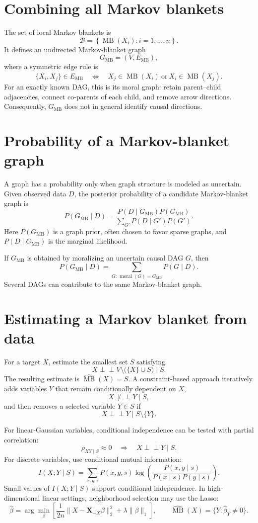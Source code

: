 \documentclass[11pt]{article}
\newcommand{\MB}{\operatorname{MB}}
\newcommand{\indep}{\perp\!\!\!\perp}
\begin{document}
\section{Combining all Markov blankets}

The set of local Markov blankets is
\[
  \mathcal{B}=\left\{\MB(X_i): i=1,\ldots,n\right\}.
\]
It defines an undirected Markov-blanket graph
\[
  G_{\mathrm{MB}}=(V,E_{\mathrm{MB}}),
\]
where a symmetric edge rule is
\[
  \{X_i,X_j\}\in E_{\mathrm{MB}}
  \quad\Longleftrightarrow\quad
  X_j\in\MB(X_i)\ \text{or}\ X_i\in\MB(X_j).
\]
For an exactly known DAG, this is its moral graph: retain parent--child
adjacencies, connect co-parents of each child, and remove arrow directions.
Consequently, $G_{\mathrm{MB}}$ does not in general identify causal directions.

\section{Probability of a Markov-blanket graph}

A graph has a probability only when graph structure is modeled as uncertain.
Given observed data $D$, the posterior probability of a candidate
Markov-blanket graph is
\[
  P(G_{\mathrm{MB}}\mid D)=
  \frac{P(D\mid G_{\mathrm{MB}})P(G_{\mathrm{MB}})}
       {\sum_{G'}P(D\mid G')P(G')}.
\]
Here $P(G_{\mathrm{MB}})$ is a graph prior, often chosen to favor sparse
graphs, and $P(D\mid G_{\mathrm{MB}})$ is the marginal likelihood.

If $G_{\mathrm{MB}}$ is obtained by moralizing an uncertain causal DAG $G$,
then
\[
  P(G_{\mathrm{MB}}\mid D)=
  \sum_{G:\,\operatorname{moral}(G)=G_{\mathrm{MB}}}P(G\mid D).
\]
Several DAGs can contribute to the same Markov-blanket graph.

\section{Estimating a Markov blanket from data}

For a target $X$, estimate the smallest set $S$ satisfying
\[
  X\indep V\setminus\bigl(\{X\}\cup S\bigr)\mid S.
\]
The resulting estimate is $\widehat{\MB}(X)=S$. A constraint-based approach
iteratively adds variables $Y$ that remain conditionally dependent on $X$,
\[
  X\not\indep Y\mid S,
\]
and then removes a selected variable $Y\in S$ if
\[
  X\indep Y\mid S\setminus\{Y\}.
\]

For linear-Gaussian variables, conditional independence can be tested with
partial correlation:
\[
  \rho_{XY\mid S}\approx0\quad\Longrightarrow\quad X\indep Y\mid S.
\]
For discrete variables, use conditional mutual information:
\[
  I(X;Y\mid S)=\sum_{x,y,s}P(x,y,s)
  \log\!\left(\frac{P(x,y\mid s)}{P(x\mid s)P(y\mid s)}\right).
\]
Small values of $I(X;Y\mid S)$ support conditional independence. In
high-dimensional linear settings, neighborhood selection may use the Lasso:
\[
  \widehat{\beta}=\arg\min_{\beta}\left[
  \frac{1}{2n}\lVert X-\mathbf{X}_{-X}\beta\rVert_2^2+
  \lambda\lVert\beta\rVert_1\right],
  \qquad
  \widehat{\MB}(X)=\{Y:\widehat{\beta}_Y\ne0\}.
\]
\end{document}
